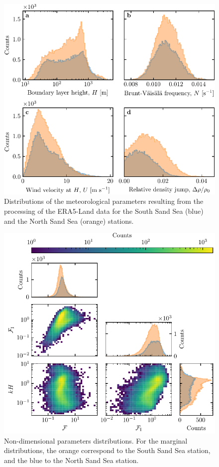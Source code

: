 \begin{figure}[p]
\centering
\includegraphics{Figures/Figure12_supp.pdf}
\caption{Distributions of the meteorological parameters resulting from the processing of the ERA5-Land data for the South Sand Sea (blue) and the North Sand Sea (orange) stations.}
\label{Fig12_supp}
\end{figure}

\begin{figure}[p]
\centering
\includegraphics[scale=1]{Figures/Figure13_supp.pdf}
\caption{Non-dimensional parameters distributions. For the marginal distributions, the orange correspond to the South Sand Sea station, and the blue to the North Sand Sea station.}
\label{Fig13_supp}
\end{figure}

